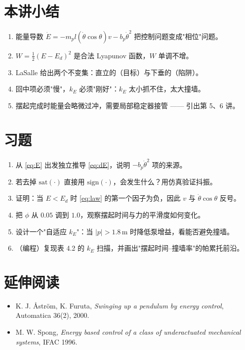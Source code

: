 \section{本讲小结}
\begin{enumerate}[leftmargin=2em,itemsep=2pt]
  \item 能量导数 $\dot E=-m_p l(\dot\theta\cos\theta)v-b_p\dot\theta^2$ 把控制问题变成"相位"问题。
  \item $W=\tfrac12(E-E_d)^2$ 是合法 Lyapunov 函数，$W$ 单调不增。
  \item LaSalle 给出两个不变集：直立的（目标）与下垂的（陷阱）。
  \item 回中项必须"慢"，$k_E$ 必须"刚好"：$k_E$ 太小抓不住，太大撞墙。
  \item 摆起完成时能量会略微过冲，需要局部稳定器接管 —— 引出第 5、6 讲。
\end{enumerate}

\section*{习题}
\begin{enumerate}[leftmargin=2em,itemsep=6pt]
  \item 从 \eqref{eq:E} 出发独立推导 \eqref{eq:dE}，说明 $-b_p\dot\theta^2$ 项的来源。
  \item 若去掉 $\mathrm{sat}(\cdot)$ 直接用 $\mathrm{sign}(\cdot)$，会发生什么？用仿真验证抖振。
  \item 证明：当 $E<E_d$ 时 \eqref{eq:law} 的第一个因子为负，因此 $v$ 与 $\dot\theta\cos\theta$ 反号。
  \item 把 $\phi$ 从 $0.05$ 调到 $1.0$，观察摆起时间与力的平滑度如何变化。
  \item 设计一个"自适应 $k_E$"：当 $|p|>1.8$\,m 时降低泵增益，看能否避免撞墙。
  \item （编程）复现表 4.2 的 $k_E$ 扫描，并画出"摆起时间–撞墙率"的帕累托前沿。
\end{enumerate}

\section*{延伸阅读}
\begin{itemize}[leftmargin=2em,itemsep=2pt]
  \item K. J. Åström, K. Furuta, \emph{Swinging up a pendulum by energy control}, Automatica 36(2), 2000.
  \item M. W. Spong, \emph{Energy based control of a class of underactuated mechanical systems}, IFAC 1996.
\end{itemize}
